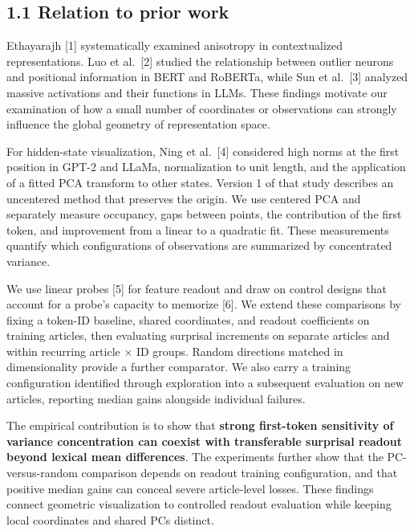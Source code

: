 \FloatBarrier

\subsection{1.1 Relation to prior work}\label{relation-to-prior-work}

Ethayarajh {[}1{]} systematically examined anisotropy in contextualized representations. Luo et al.~{[}2{]} studied the relationship between outlier neurons and positional information in BERT and RoBERTa, while Sun et al.~{[}3{]} analyzed massive activations and their functions in LLMs. These findings motivate our examination of how a small number of coordinates or observations can strongly influence the global geometry of representation space.

For hidden-state visualization, Ning et al.~{[}4{]} considered high norms at the first position in GPT-2 and LLaMa, normalization to unit length, and the application of a fitted PCA transform to other states. Version 1 of that study describes an uncentered method that preserves the origin. We use centered PCA and separately measure occupancy, gaps between points, the contribution of the first token, and improvement from a linear to a quadratic fit. These measurements quantify which configurations of observations are summarized by concentrated variance.

We use linear probes {[}5{]} for feature readout and draw on control designs that account for a probe's capacity to memorize {[}6{]}. We extend these comparisons by fixing a token-ID baseline, shared coordinates, and readout coefficients on training articles, then evaluating surprisal increments on separate articles and within recurring article × ID groups. Random directions matched in dimensionality provide a further comparator. We also carry a training configuration identified through exploration into a subsequent evaluation on new articles, reporting median gains alongside individual failures.

The empirical contribution is to show that \textbf{strong first-token sensitivity of variance concentration can coexist with transferable surprisal readout beyond lexical mean differences}. The experiments further show that the PC-versus-random comparison depends on readout training configuration, and that positive median gains can conceal severe article-level losses. These findings connect geometric visualization to controlled readout evaluation while keeping local coordinates and shared PCs distinct.

